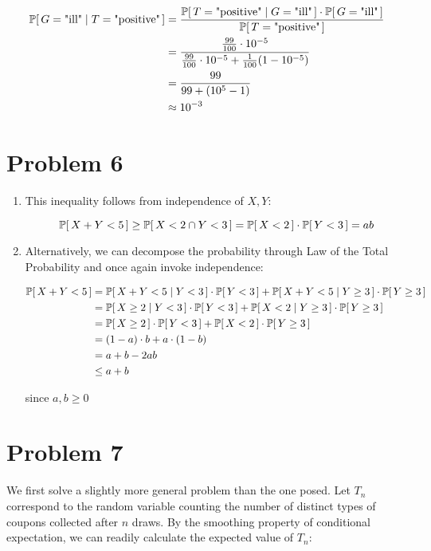 \documentclass[12pt]{article}%
\begin{document}
\begin{align*}
  \mathbb{P}[\,G = \text{"ill"} \mid T = \text{"positive"}\,] & = \frac{\mathbb{P}[\,T = \text{"positive"} \mid G = \text{"ill"}\,] \cdot \mathbb{P}[\,G = \text{"ill"}\,]}{\mathbb{P}[\,T = \text{"positive"}\,]} \\
  & = \frac{\frac{99}{100} \cdot 10^{-5}}{\frac{99}{100} \cdot 10^{-5} + \frac{1}{100}(1- 10^{-5})} \\
  & = \frac{99}{99 + (10^5 - 1)}  \\
  & \approx 10^{-3}
\end{align*}

\section{Problem 6}
\begin{enumerate}
  \item This inequality follows from independence of $X,Y$:

  \[ \mathbb{P}[\,X + Y < 5\,] \geq \mathbb{P}[\,X < 2 \cap Y < 3\,]  = \mathbb{P}[\,X < 2\,] \cdot\mathbb{P}[\,Y < 3\,] = ab\]

  \item

  Alternatively, we can decompose the probability through Law of the Total Probability and once again invoke independence:

  \begin{align*}
    \mathbb{P}[\,X + Y < 5\,] & = \mathbb{P}[\,X + Y < 5 \mid Y < 3\,] \cdot \mathbb{P}[\,Y < 3\,] + \mathbb{P}[\,X + Y < 5 \mid Y \geq 3\,] \cdot \mathbb{P}[\,Y \geq 3\,] \\
    & = \mathbb{P}[\,X  \geq 2 \mid Y < 3\,] \cdot \mathbb{P}[\,Y < 3\,] + \mathbb{P}[\,X < 2 \mid Y \geq 3\,] \cdot \mathbb{P}[\,Y \geq 3\,] \\
    & = \mathbb{P}[\,X  \geq 2\,] \cdot \mathbb{P}[\,Y < 3\,] + \mathbb{P}[\,X < 2\,] \cdot \mathbb{P}[\,Y \geq 3\,] \\
    & = (1 - a)\cdot b + a \cdot (1 - b) \\
    & = a + b - 2ab \\
    & \leq a + b
  \end{align*}

  since $a,b \geq 0$
\end{enumerate}

\section{Problem 7}

We first solve a slightly more general problem than the one posed. Let $T_n$ correspond to the random variable counting the number of distinct types of coupons collected after $n$ draws. By the smoothing property of conditional expectation, we can readily calculate the expected value of $T_n$:
\end{document}
